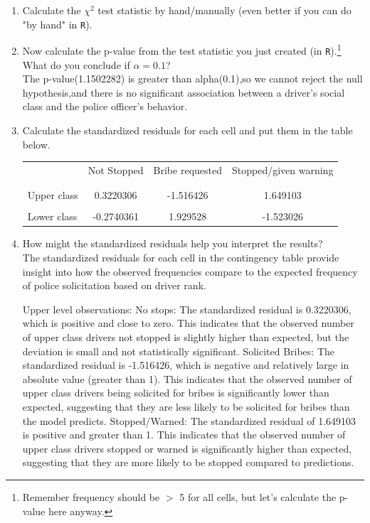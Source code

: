 \documentclass[12pt,letterpaper]{article}
\begin{document}
	\begin{enumerate}
		
		\item [(a)]
		Calculate the $\chi^2$ test statistic by hand/manually (even better if you can do "by hand" in \texttt{R}).\\
		\item [(b)]
		Now calculate the p-value from the test statistic you just created (in \texttt{R}).\footnote{Remember frequency should be $>$ 5 for all cells, but let's calculate the p-value here anyway.}  What do you conclude if $\alpha = 0.1$?\\
		The p-value(1.1502282) is greater than alpha(0.1),so we cannot reject the null hypothesis,and there is no significant association between a driver's social class and the police officer's behavior.\\
		
		\item [(c)] Calculate the standardized residuals for each cell and put them in the table below.
		
		\begin{table}[h]
			\centering
			\begin{tabular}{l | c c c }
				& Not Stopped & Bribe requested & Stopped/given warning \\
				\\[-1.8ex] 
				\hline \\[-1.8ex]
				Upper class  &0.3220306  &-1.516426  &1.649103  \\
				\\
				Lower class  &-0.2740361  &1.929528   & -1.523026  \\
				
			\end{tabular}
		\end{table}
		
		
		\vspace{7cm}
		\item [(d)] How might the standardized residuals help you interpret the results?  
		\\   The standardized residuals for each cell in the contingency table provide insight into how the observed frequencies compare to the expected frequency of police solicitation based on driver rank.
		
		Upper level observations:
		No stops: The standardized residual is 0.3220306, which is positive and close to zero. This indicates that the observed number of upper class drivers not stopped is slightly higher than expected, but the deviation is small and not statistically significant.
		Solicited Bribes: The standardized residual is -1.516426, which is negative and relatively large in absolute value (greater than 1). This indicates that the observed number of upper class drivers being solicited for bribes is significantly lower than expected, suggesting that they are less likely to be solicited for bribes than the model predicts.
		Stopped/Warned: The standardized residual of 1.649103 is positive and greater than 1. This indicates that the observed number of upper class drivers stopped or warned is significantly higher than expected, suggesting that they are more likely to be stopped compared to predictions.
		

\end{enumerate}
\end{document}

